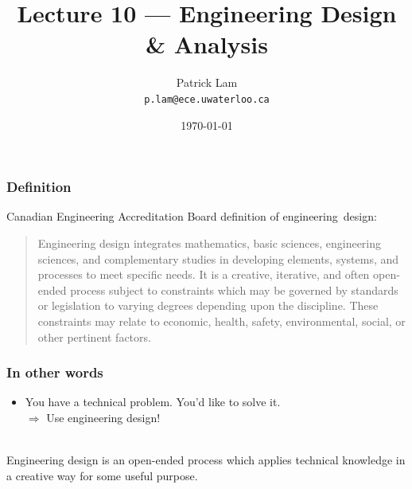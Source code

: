 

\usepackage{tikz}
\usetikzlibrary{arrows,automata,shapes,matrix,chains,scopes,positioning,calc}


\title{Lecture 10 --- Engineering Design \& Analysis}

\author{Patrick Lam \\ \small \texttt{p.lam@ece.uwaterloo.ca}}
\date{\today}





\begin{frame}
  \titlepage
\end{frame}

\begin{frame}
\frametitle{Definition}

Canadian Engineering Accreditation Board definition of
engineering~design:

{
\begin{quote}
Engineering design integrates mathematics, basic sciences, engineering sciences, and complementary studies in developing elements, systems, and processes to meet specific needs.  It is a creative, iterative, and often open-ended process subject to constraints which may be governed by standards or legislation to varying degrees depending upon the discipline.  These constraints may relate to economic, health, safety, environmental, social, or other pertinent factors.
\end{quote}
}

\end{frame}

\begin{frame}
\frametitle{In other words}

\large
\begin{changemargin}{1cm}
\begin{itemize}
\item You have a technical problem. You'd like to solve it.\\
 $\Rightarrow$ Use engineering design!
\end{itemize}
~\\

Engineering design is an open-ended process which applies technical knowledge in a creative
way for some useful purpose.
\end{changemargin}

\end{frame}

